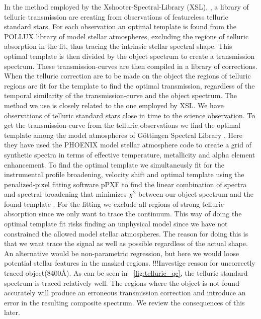 \documentclass{aa}    %
\newcommand{\figref}[1]{\ref{fig:#1}}
\newcommand{\Fig}[1]{\figurename~\figref{#1}}
\newcommand{\fig}[1]{\Fig{#1}}
\begin{document}
In the method employed by the Xshooter-Spectral-Library (XSL), \citep{Chen2014}, a library of telluric transmission are creating from observations of featureless telluric standard stars. For each observation an optimal template is found from the POLLUX library of model stellar atmospheres, excluding the regions of telluric absorption in the fit, thus tracing the intrinsic stellar spectral shape. This optimal template is then divided by the object spectrum to create a transmission spectrum. These transmission-curves are then compiled in a library of corrections. When the telluric correction are to be made on the object the regions of telluric regions are fit for the template to find the optimal transmission, regardless of the temporal similarity of the transmission-curve and the object spectrum. The method we use is closely related to the one employed by XSL. We have observations of telluric standard stars close in time to the science observation. To get the transmission-curve from the telluric observations we find the optimal template among the model atmospheres of G\"ottingen Spectral Library \citep{Husser2013}. Here they have used the PHOENIX model stellar atmosphere code to create a grid of synthetic spectra in terms of effective temperature, metallicity and alpha element enhancement. To find the optimal template we simultaneusly fit for the instrumental profile broadening, velocity shift and optimal template using the penalized-pixel fitting software pPXF \citep{Cappellari2004} to find the linear combination of spectra and spectral broadening that minimizes $\chi ^2$ between our object spectrum and the found template . For the fitting we exclude all regions of strong telluric absorption since we only want to trace the continuum. This way of doing the optimal template fit risks finding an unphysical model since we have not constrained the allowed model stellar atmospheres. The reason for doing this is that we want trace the signal as well as possible regardless of the actual shape. An alternative would be non-parametric regression, but here we would loose potential stellar features in the masked regions. !!!Investige reason for uncorrectly traced object(8400\r{A}). As can be seen in \fig{telluric_qc}, the telluric standard spectrum is traced relatively well. The regions where the object is not found accurately will produce an erroneous transmission correction and introduce an error in the resulting composite spectrum. We review the consequences of this later. 



\end{document}
